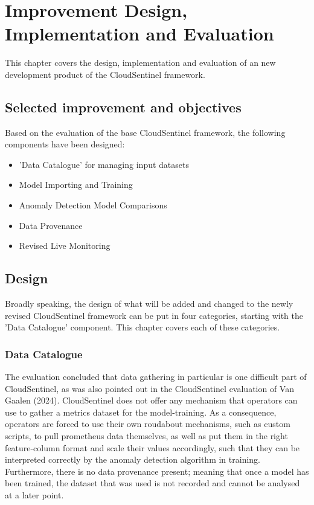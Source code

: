 \chapter{Improvement Design, Implementation and Evaluation}%
\label{ch:improvement_design_implementation_and_evaluation}


This chapter covers the design, implementation and evaluation of an new development product of the CloudSentinel framework.

\section{Selected improvement and objectives}

Based on the evaluation of the base CloudSentinel framework, the following components have been designed:

\begin{itemize}
    \item 'Data Catalogue' for managing input datasets
    \item Model Importing and Training
    \item Anomaly Detection Model Comparisons
    \item Data Provenance
    \item Revised Live Monitoring
\end{itemize}

\section{Design}
Broadly speaking, the design of what will be added and changed to the newly revised CloudSentinel framework can be put in four categories, starting with the 'Data Catalogue' component. This chapter covers each of these categories.

\subsection{Data Catalogue}
The evaluation concluded that data gathering in particular is one difficult part of CloudSentinel, as was also pointed out in the CloudSentinel evaluation of Van Gaalen (2024). CloudSentinel does not offer any mechanism that operators can use to gather a metrics dataset for the model-training. As a consequence, operators are forced to use their own roudabout mechanisms, such as custom scripts, to pull prometheus data  themselves, as well as put them in the right feature-column format and scale their values accordingly, such that they can be interpreted correctly by the anomaly detection algorithm in training. Furthermore, there is no data provenance present; meaning that once a model has been trained, the dataset that was used is not recorded and cannot be analysed at a later point.\\

